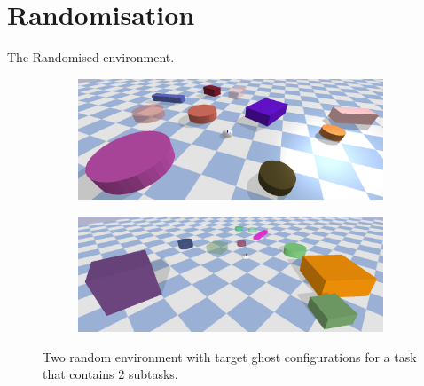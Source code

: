 \section{Randomisation}%
\label{sec:randomisation}
The Randomised environment.\bs
{}

\begin{figure}[H]
    \centering
    \begin{subfigure}{\textwidth}
    \centering
    \includegraphics[width=1.0\textwidth]{figures/tests/random_1}
    \end{subfigure}
    \begin{subfigure}{\textwidth}
    \centering
    \includegraphics[width=1.0\textwidth]{figures/tests/random_2}
    \end{subfigure}
    \caption{Two random environment with target ghost configurations for a task that contains 2 subtasks.}%
    \label{fig:random_environnment}
\end{figure}

